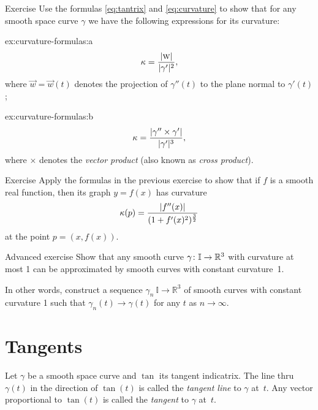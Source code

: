 \begin{thm}{Exercise}\label{ex:curvature-formulas}
Use the formulas \ref{eq:tantrix} and \ref{eq:curvature} to show that 
for any smooth space curve $\gamma$ we have the following expressions for its curvature:
\setlength{\columnseprule}{0.4pt}
\begin{multicols}{2}

\begin{subthm}{ex:curvature-formulas:a} 
\[\kappa=\frac{|\text{\sc{w}}|}{|\gamma'|^2},\]
where $\vec w=\vec w(t)$ denotes the projection of $\gamma''(t)$ to the plane normal to $\gamma'(t)$;
\end{subthm}

\begin{subthm}{ex:curvature-formulas:b}
\[\kappa=\frac{|\gamma''\times \gamma'|}{|\gamma'|^{3}},\]
where $\times$ denotes the \emph{vector product} (also known as \emph{cross product}).
\end{subthm}
\end{multicols}
\end{thm}


\begin{thm}{Exercise}\label{ex:curvature-graph}
Apply the formulas in the previous exercise to show that if $f$ is a smooth real function,
then its graph $y=f(x)$  has curvature
\[\kappa(p)=\frac{|f''(x)|}{(1+f'(x)^2)^{\frac32}}\]
at the point $p=(x,f(x))$.
\end{thm}

\begin{thm}{Advanced exercise}\label{ex:approximation-const-curvature}
Show that any smooth curve $\gamma\:\mathbb{I}\z\to\mathbb{R}^3$ with curvature at most 1 can be approximated by smooth curves with constant curvature~1.

In other words, construct a sequence $\gamma_n\:\mathbb{I}\to\mathbb{R}^3$ of smooth curves  with constant curvature 1 such that $\gamma_n(t)\to \gamma(t)$ for any $t$ as $n\to\infty$.
\end{thm}

\section{Tangents}

Let $\gamma$ be a smooth space curve and $\tan$ its tangent indicatrix.
The line thru $\gamma(t)$ in the direction of $\tan(t)$ is called the \emph{tangent line} to $\gamma$  at~$t$.
Any vector proportional to $\tan(t)$ is called the \emph{tangent} to $\gamma$ at~$t$.


